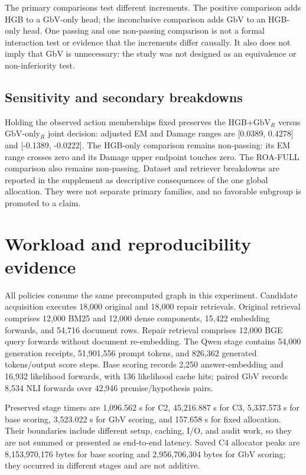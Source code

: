 \documentclass[11pt]{article}
\begin{document}
The primary comparisons test different increments. The positive comparison adds HGB to a GbV-only head; the inconclusive comparison adds GbV to an HGB-only head. One passing and one non-passing comparison is not a formal interaction test or evidence that the increments differ causally. It also does not imply that GbV is unnecessary: the study was not designed as an equivalence or non-inferiority test.

\subsection{Sensitivity and secondary breakdowns}
Holding the observed action memberships fixed preserves the HGB+GbV$_R$ versus GbV-only$_R$ joint decision: adjusted EM and Damage ranges are [0.0389, 0.4278] and [-0.1389, -0.0222]. The HGB-only comparison remains non-passing: its EM range crosses zero and its Damage upper endpoint touches zero. The ROA-FULL comparison also remains non-passing. Dataset and retriever breakdowns are reported in the supplement as descriptive consequences of the one global allocation. They were not separate primary families, and no favorable subgroup is promoted to a claim.

\section{Workload and reproducibility evidence}
All policies consume the same precomputed graph in this experiment. Candidate acquisition executes 18,000 original and 18,000 repair retrievals. Original retrieval comprises 12,000 BM25 and 12,000 dense components, 15,422 embedding forwards, and 54,716 document rows. Repair retrieval comprises 12,000 BGE query forwards without document re-embedding. The Qwen stage contains 54,000 generation receipts, 51,901,556 prompt tokens, and 826,362 generated tokens/output score steps. Base scoring records 2,250 answer-embedding and 16,932 likelihood forwards, with 136 likelihood cache hits; paired GbV records 8,534 NLI forwards over 42,946 premise/hypothesis pairs.

Preserved stage timers are 1,096.562 s for C2, 45,216.887 s for C3, 5,337.573 s for base scoring, 3,523.022 s for GbV scoring, and 157.658 s for fixed allocation. Their boundaries include different setup, caching, I/O, and audit work, so they are not summed or presented as end-to-end latency. Saved C4 allocator peaks are 8,153,970,176 bytes for base scoring and 2,956,706,304 bytes for GbV scoring; they occurred in different stages and are not additive.
\end{document}
